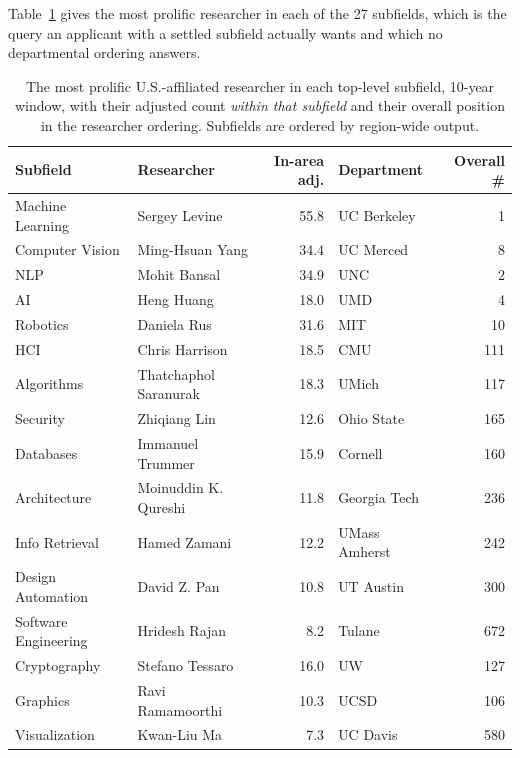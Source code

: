 \documentclass[11pt]{article}
\begin{document}
Table~\ref{tab:arealeaders} gives the most prolific researcher in each of the
27 subfields, which is the query an applicant with a settled subfield actually
wants and which no departmental ordering answers.

\begin{table}[p]
\centering
\small
\caption{The most prolific U.S.-affiliated researcher in each top-level
subfield, 10-year window, with their adjusted count \emph{within that subfield}
and their overall position in the researcher ordering. Subfields are ordered by
region-wide output.}
\label{tab:arealeaders}
\begin{tabular}{llrlr}
\toprule
Subfield & Researcher & In-area adj. & Department & Overall \# \\
\midrule
Machine Learning      & Sergey Levine          & 55.8 & UC Berkeley   & 1 \\
Computer Vision       & Ming-Hsuan Yang        & 34.4 & UC Merced     & 8 \\
NLP                   & Mohit Bansal           & 34.9 & UNC           & 2 \\
AI                    & Heng Huang             & 18.0 & UMD           & 4 \\
Robotics              & Daniela Rus            & 31.6 & MIT           & 10 \\
HCI                   & Chris Harrison         & 18.5 & CMU           & 111 \\
Algorithms            & Thatchaphol Saranurak  & 18.3 & UMich         & 117 \\
Security              & Zhiqiang Lin           & 12.6 & Ohio State    & 165 \\
Databases             & Immanuel Trummer       & 15.9 & Cornell       & 160 \\
Architecture          & Moinuddin K. Qureshi   & 11.8 & Georgia Tech  & 236 \\
Info Retrieval        & Hamed Zamani           & 12.2 & UMass Amherst & 242 \\
Design Automation     & David Z. Pan           & 10.8 & UT Austin     & 300 \\
Software Engineering  & Hridesh Rajan          & 8.2  & Tulane        & 672 \\
Cryptography          & Stefano Tessaro        & 16.0 & UW            & 127 \\
Graphics              & Ravi Ramamoorthi       & 10.3 & UCSD          & 106 \\
Visualization         & Kwan-Liu Ma            & 7.3  & UC Davis      & 580 \\

\end{tabular}
\end{table}
\end{document}
